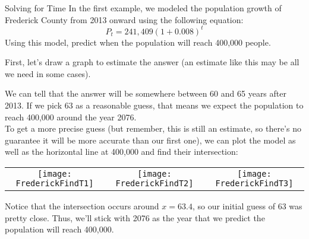 \begin{example}{Solving for Time}
In the first example, we modeled the population growth of Frederick County from 2013 onward using the following equation:
\[P_t = 241,409(1+0.008)^t\]
Using this model, predict when the population will reach 400,000 people.

\sol
First, let's draw a graph to estimate the answer (an estimate like this may be all we need in some cases).
\begin{center}
\end{center}

We can tell that the answer will be somewhere between 60 and 65 years after 2013.  If we pick 63 as a reasonable guess, that means we expect the population to reach 400,000 around the year 2076.\\

To get a more precise guess (but remember, this is still an estimate, so there's no guarantee it will be more accurate than our first one), we can plot the model as well as the horizontal line at 400,000 and find their intersection:
\begin{center}
\begin{tabular}{c c c}
\texttt{[image: FrederickFindT1]}
& \texttt{[image: FrederickFindT2]}
& \texttt{[image: FrederickFindT3]}
\end{tabular}
\end{center}

Notice that the intersection occurs around $x=63.4$, so our initial guess of 63 was pretty close.  Thus, we'll stick with 2076 as the year that we predict the population will reach 400,000.
\end{example}

